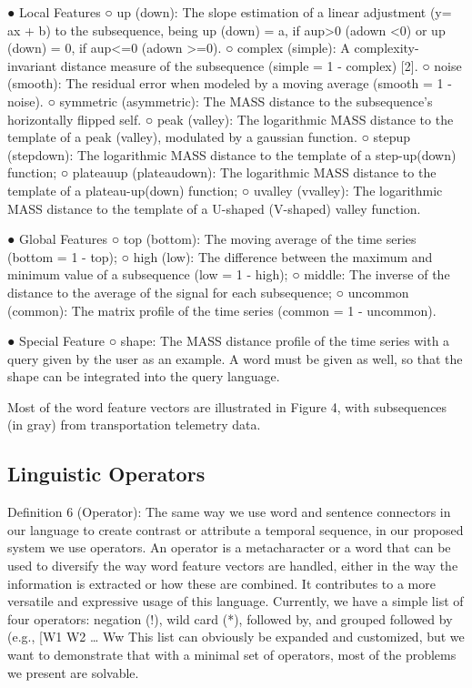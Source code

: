 ●	Local Features
○	up (down): The slope estimation of a linear adjustment (y= ax + b) to the subsequence, being up (down) = a, if aup>0 (adown <0) or up (down) = 0, if aup<=0 (adown >=0).
○	complex (simple): A complexity-invariant distance measure of the subsequence (simple = 1 - complex) [2].
○	noise (smooth): The residual error when modeled by a moving average (smooth = 1 - noise). 
○	symmetric (asymmetric): The MASS distance to the subsequence’s horizontally flipped self. 
○	peak (valley): The logarithmic MASS distance to the template of a peak (valley), modulated by a gaussian function.
○	stepup (stepdown): The logarithmic MASS distance to the template of a step-up(down) function;
○	plateauup (plateaudown): The logarithmic MASS distance to the template of a plateau-up(down) function;
○	uvalley (vvalley): The logarithmic MASS distance to the template of a U-shaped (V-shaped) valley function.

●	Global Features
○	top (bottom): The moving average of the time series (bottom = 1 - top);
○	high (low): The difference between the maximum and minimum value of a subsequence (low = 1 - high);
○	middle: The inverse of the distance to the average of the signal for each subsequence;
○	uncommon (common): The matrix profile of the time series (common = 1 - uncommon).

●	Special Feature
○	shape: The MASS distance profile of the time series with a query given by the user as an example. A word must be given as well, so that the shape can be integrated into the query language.    

Most of the word feature vectors are illustrated in Figure 4, with subsequences (in gray) from transportation telemetry data. 



\subsection{Linguistic Operators}

Definition 6 (Operator): The same way we use word and sentence connectors in our language to create contrast or attribute a temporal sequence, in our proposed system we use operators. An operator is a metacharacter or a word that can be used to diversify the way word feature vectors are handled, either in the way the information is extracted or how these are combined.  It contributes to a more versatile and expressive usage of this language. Currently, we have a simple list of four operators: negation (!), wild card (*), followed by, and grouped followed by (e.g., [W1 W2 … Ww This list can obviously be expanded and customized, but we want to demonstrate that with a minimal set of operators, most of the problems we present are solvable. 

